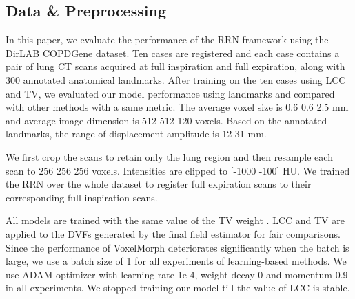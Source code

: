 \documentclass[runningheads]{llncs}
\begin{document}
\subsection{Data \& Preprocessing}
In this paper, we evaluate the performance of the RRN framework using the DirLAB COPDGene dataset. Ten cases are registered and each case contains a pair of lung CT scans acquired at full inspiration and full expiration, along with 300 annotated anatomical landmarks. After training on the ten cases using LCC and TV, we evaluated our model performance using landmarks and compared with other methods with a same metric. The average voxel size is 0.6  0.6  2.5 mm and average image dimension is 512  512  120 voxels. Based on the annotated landmarks, the range of displacement amplitude is 12-31 mm.

We first crop the scans to retain only the lung region and then resample each scan to 256  256  256 voxels. Intensities are clipped to [-1000 -100] HU. We trained the RRN over the whole dataset to register full expiration scans to their corresponding full inspiration scans. 

All models are trained with the same value of the TV weight . LCC and TV are applied to the DVFs generated by the final field estimator for fair comparisons. Since the performance of VoxelMorph deteriorates significantly when the batch is large, we use a batch size of 1 for all experiments of learning-based methods. We use ADAM optimizer with learning rate 1e-4, weight decay 0 and momentum 0.9 in all experiments. We stopped training our model till the value of LCC is stable. 
\end{document}
